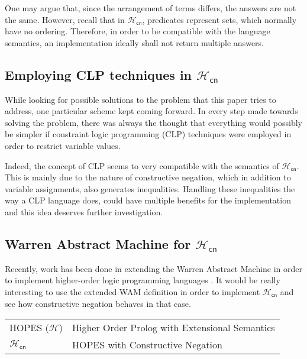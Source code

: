 \documentclass[inscr,ack,preface]{dithesis}
\theoremstyle{definition}
\newcommand{\hcn}{$\mathcal{H}_\mathsf{cn}$}
\begin{document}
One may argue that, since the arrangement of terms differs, the answers are not the same. However, recall that in \hcn{}, predicates represent sets, which normally have no ordering. Therefore, in order to be compatible with the language semantics, an implementation ideally shall not return multiple answers.

\subsection*{Employing CLP techniques in \hcn{}}
While looking for possible solutions to the problem that this paper tries to address, one particular scheme kept coming forward. In every step made towards solving the problem, there was always the thought that everything would possibly be simpler if constraint logic programming (CLP) techniques were employed in order to restrict variable values.

Indeed, the concept of CLP seems to very compatible with the semantics of \hcn{}. This is mainly due to the nature of constructive negation, which in addition to variable assignments, also generates inequalities. Handling these inequalities the way a CLP language does, could have multiple benefits for the implementation and this idea deserves further investigation.

\subsection*{Warren Abstract Machine for \hcn{}}
Recently, work has been done in extending the Warren Abstract Machine in order to implement higher-order logic programming languages \cite{1324952}. It would be really interesting to use the extended WAM definition in order to implement \hcn{} and see how constructive negation behaves in that case.

\backmatter

\abbreviations
\begin{center}
	\renewcommand{\arraystretch}{1.5}
	\begin{longtable}{ l @{\qquad} l }
	\toprule
	  HOPES ($\mathcal{H}$)    & Higher Order Prolog with Extensional Semantics \\
    \hcn{}   & HOPES with Constructive Negation \\
	\bottomrule
	\end{longtable}
\end{center}

%
%
%



\end{document}
